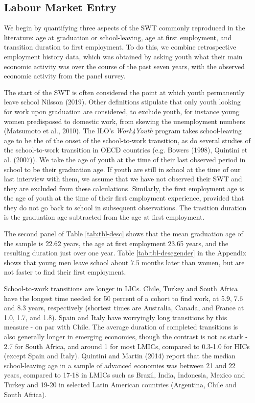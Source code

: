 \documentclass[
  11pt,
a4paper
]{article}
\begin{document}
\hypertarget{survey-entry}{%
\subsection{Labour Market Entry}\label{survey-entry}}

We begin by quantifying three aspects of the SWT commonly reproduced in the literature: age at graduation or school-leaving, age at first employment, and transition duration to first employment. To do this, we combine retrospective employment history data, which was obtained by asking youth what their main economic activity was over the course of the past seven years, with the observed economic activity from the panel survey.

The start of the SWT is often considered the point at which youth permanently leave school Nilsson (2019). Other definitions stipulate that only youth looking for work upon graduation are considered, to exclude youth, for instance young women predisposed to domestic work, from skewing the unemployment numbers (Matsumoto et al., 2010). The ILO's \emph{Work4Youth} program takes school-leaving age to be the of the onset of the school-to-work transition, as do several studies of the school-to-work transition in OECD countries (e.g. Bowers (1998), Quintini et al. (2007)). We take the age of youth at the time of their last observed period in school to be their graduation age. If youth are still in school at the time of our last interview with them, we assume that we have not observed their SWT and they are excluded from these calculations. Similarly, the first employment age is the age of youth at the time of their first employment experience, provided that they do not go back to school in subsequent observations. The trasition duration is the graduation age subtracted from the age at first employment.

The second panel of Table \ref{tab:tbl-desc} shows that the mean graduation age of the sample is 22.62 years, the age at first employment 23.65 years, and the resulting duration just over one year. Table \ref{tab:tbl-descgender} in the Appendix shows that young men leave school about 7.5 months later than women, but are not faster to find their first employment.

School-to-work transitions are longer in LICs. Chile, Turkey and South Africa have the longest time needed for 50 percent of a cohort to find work, at 5.9, 7.6 and 8.3 years, respectively (shortest times are Australia, Canada, and France at 1.0, 1.7, and 1.8). Spain and Italy have worryingly long transitions by this measure - on par with Chile. The average duration of completed transitions is also generally longer in emerging economies, though the contrast is not as stark - 2.7 for South Africa, and around 1 for most LMICs, compared to 0.3-1.0 for HICs (except Spain and Italy). Quintini and Martin (2014) report that the median school-leaving age in a sample of advanced economies was between 21 and 22 years, compared to 17-18 in LMICs such as Brazil, India, Indonesia, Mexico and Turkey and 19-20 in selected Latin American countries (Argentina, Chile and South Africa).
\end{document}
